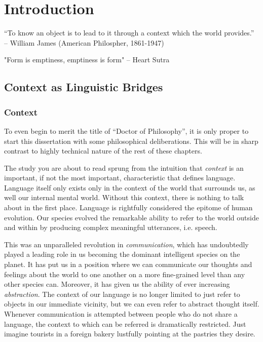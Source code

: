 \chapter{Introduction}

“To know an object is to lead to it through a context which the world
provides.” -- William James (American Philospher, 1861-1947)

"Form is emptiness, emptiness is form" -- Heart Sutra

\section{Context as Linguistic Bridges}

\subsection{Context}

To even begin to merit the title of ``Doctor of Philosophy'', it is only proper
to start this dissertation with some philosophical deliberations. This will be
in sharp contrast to highly technical nature of the rest of these chapters.

The study you are about to read sprung from the intuition that \emph{context}
is an important, if not the most important, characteristic that defines
language. Language itself only exists only in the context of the world that
surrounds us, as well our internal mental world. Without this context, there is
nothing to talk about in the first place. Language is rightfully considered the
epitome of human evolution. Our species evolved the remarkable ability to refer to the
world outside and within by producing complex meaningful utterances, i.e. speech. 

This was an unparalleled revolution in \emph{communication}, which has
undoubtedly played a leading role in us becoming the dominant intelligent species
on the planet. It has put us in a position where we can communicate our
thoughts and feelings about the world to one another on a more fine-grained
level than any other species can. Moreover, it has given us the ability of ever increasing
\emph{abstraction}. The context of our language is no longer limited to just
refer to objects in our immediate vicinity, but we can even refer to abstract
thought itself. Whenever communication is attempted between people who do not
share a language, the context to which can be referred is dramatically restricted.
Just imagine tourists in a foreign bakery lustfully pointing at the
pastries they desire. 

